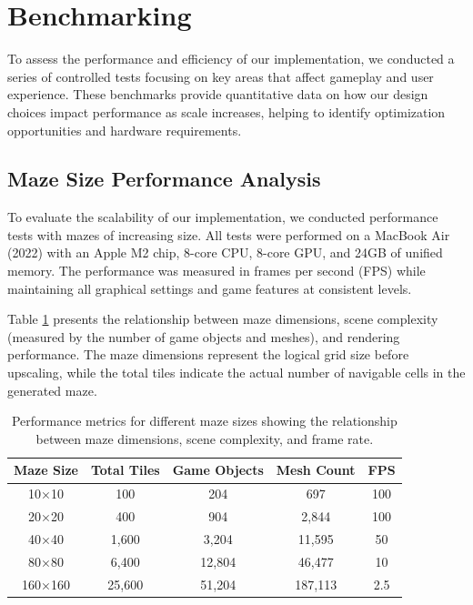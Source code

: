 \documentclass{article}
\begin{document}
\section{Benchmarking}\label{sec:benchmarking}
To assess the performance and efficiency of our implementation, we conducted a
series of controlled tests focusing on key areas that affect gameplay and user
experience. These benchmarks provide quantitative data on how our design
choices impact performance as scale increases, helping to identify optimization
opportunities and hardware requirements.

\subsection{Maze Size Performance Analysis}
To evaluate the scalability of our implementation, we conducted performance tests with mazes of increasing size. All tests were performed on a MacBook Air (2022) with an Apple M2 chip, 8-core CPU, 8-core GPU, and 24GB of unified memory. The performance was measured in frames per second (FPS) while maintaining all graphical settings and game features at consistent levels.

Table \ref{tab:maze-performance} presents the relationship between maze dimensions, scene complexity (measured by the number of game objects and meshes), and rendering performance. The maze dimensions represent the logical grid size before upscaling, while the total tiles indicate the actual number of navigable cells in the generated maze.

\begin{table}[H]
    \centering
    \begin{tabular}{|c|c|c|c|c|}
        \hline
        \textbf{Maze Size} & \textbf{Total Tiles} & \textbf{Game Objects} & \textbf{Mesh Count} & \textbf{FPS} \\ \hline
        10×10 & 100 & 204 & 697 & 100 \\ \hline
        20×20 & 400 & 904 & 2,844 & 100 \\ \hline
        40×40 & 1,600 & 3,204 & 11,595 & 50 \\ \hline
        80×80 & 6,400 & 12,804 & 46,477 & 10 \\ \hline
        160×160 & 25,600 & 51,204 & 187,113 & 2.5 \\ \hline
    \end{tabular}
    \caption{Performance metrics for different maze sizes showing the relationship between maze dimensions, scene complexity, and frame rate.}
    \label{tab:maze-performance}
\end{table}
\end{document}
